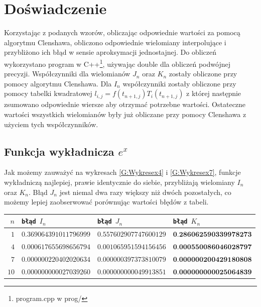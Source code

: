 \documentclass[11pt,leqno]{article}
\begin{document}
\section{Doświadczenie}\label{S:Doświadczenie}
Korzystając z podanych wzorów, obliczając odpowiednie wartości za pomocą algorytmu Clenshawa,
obliczono odpowiednie wielomiany interpolujące i przybliżono ich błąd w sensie aproksymacji
jednostajnej. Do obliczeń wykorzystano program w C++\footnote{program.cpp w prog/}, używając double dla
obliczeń podwójnej precyzji. Współczynniki dla wielomianów $J_n$ oraz $K_n$ zostały obliczone przy pomocy algorytmu Clenshawa. Dla $I_n$ współczynniki zostały obliczone przy pomocy tabelki kwadratowej $l_{i,j} = f(t_{n+1,j})T_i(t_{n+1,j})$ z której następnie zsumowano odpowiednie wiersze aby otrzymać potrzebne wartości. Ostateczne wartości wszystkich wielomianów były już obliczane przy pomocy Clenshawa z użyciem tych współczynników.
\subsection{Funkcja wykładnicza $e^x$}
Jak możemy zauważyć na wykresach \eqref{G:Wykresex4} i \eqref{G:Wykresex7}, funkcje wykładniczą najlepiej, prawie identycznie do siebie, przybliżają wielomiany $I_n$ oraz $K_n$. Błąd $J_n$ jest niemal dwa razy większy niż dwóch pozostałych, co możemy lepiej zaobserwować porównując wartości błędów z tabeli.
\begin{center}
    \begin{tabular}{r|l|l|l}
        \texttt{$n$} & \texttt{błąd $I_n$} & \texttt{błąd $J_n$} & \texttt{błąd $K_n$} \\ \hline
        $1$ & $0.369064391011796999$ & $0.557602907747600129$ & $\textbf{0.286062590339978273}$ \\
        $4$ & $0.000617655698656794$ & $0.001065951594156456$ & $\textbf{0.000550086046028797}$ \\
        $7$ & $0.000000220402020634$ & $0.000000397373810079$ & $\textbf{0.000000200429180808}$ \\
        $10$ & $0.000000000027039260$ & $0.000000000049913851$ & $\textbf{0.000000000025064839}$ \\
    \end{tabular}
\end{center}
\end{document}
